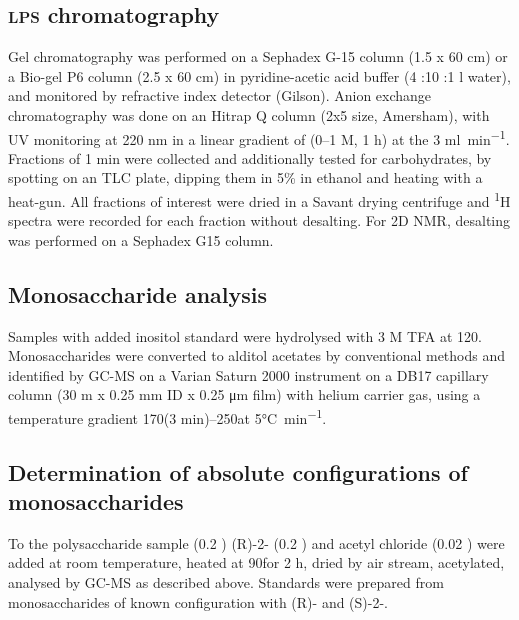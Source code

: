 \subsection{\textsc{lps} chromatography} %
\label{sub:chromatography}

Gel chromatography was performed on a Sephadex G-15 column (1.5 x 60 \si{\centi\meter}) or a
Bio-gel P6 column (2.5 x 60 \si{\centi\meter}) in pyridine-acetic acid buffer (4 \millilitre:10
\millilitre:1 \si{\litre} water), and monitored by refractive index detector (Gilson). Anion
exchange chromatography was done on an Hitrap Q column (2x5 \millilitre size, Amersham), with
\ac{UV} monitoring at 220 nm in a linear gradient of  (0--1 M, 1 h) at the 3
\si{\milli\litre\per\minute}. Fractions of 1 min were collected and additionally tested for
carbohydrates, by spotting on an  \ac{TLC} plate, dipping them in 5\%  in
ethanol and heating with a heat-gun. All fractions of interest were dried in a Savant drying
centrifuge and \textsuperscript{1}H spectra were recorded for each fraction without desalting. For
2D \ac{NMR}, desalting was performed on a Sephadex G15 column.

\subsection{Monosaccharide analysis} %
\label{sub:monosaccharide_analysis}

Samples with added inositol standard were hydrolysed with 3 M \ac{TFA} at 120\cel. Monosaccharides
were converted to alditol acetates by conventional methods and identified by \ac{GC-MS} on a
Varian Saturn 2000 instrument on a DB17 capillary column (30 m x 0.25 \si{\milli\meter} ID x 0.25
\si{\micro\meter} film) with helium carrier gas, using a temperature gradient 170\cel (3
min)--250\cel at 5\si{\degreeCelsius\per\minute}.

\subsection{Determination of absolute configurations of monosaccharides} %
\label{sub:determination_of_absolute_configurations_of_monosaccharides}

To the polysaccharide sample (0.2 \milligram) (R)-2- (0.2 \millilitre) and acetyl
chloride (0.02 \millilitre) were added at room temperature, heated at 90\cel for 2 h, dried by air
stream, acetylated, analysed by \ac{GC-MS} as described above. Standards were prepared from
monosaccharides of known configuration with (R)- and (S)-2-.

